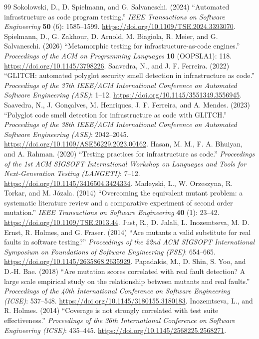 \begin{thebibliography}{99}
 Sokolowski, D., D. Spielmann, and G. Salvaneschi. (2024) ``Automated infrastructure as code program testing.'' \textit{IEEE Transactions on Software Engineering} \textbf{50} (6): 1585--1599. \url{https://doi.org/10.1109/TSE.2024.3393070}.
 Spielmann, D., G. Zakhour, D. Arnold, M. Biagiola, R. Meier, and G. Salvaneschi. (2026) ``Metamorphic testing for infrastructure-as-code engines.'' \textit{Proceedings of the ACM on Programming Languages} \textbf{10} (OOPSLA1): 118. \url{https://doi.org/10.1145/3798226}.
 Saavedra, N., and J. F. Ferreira. (2022) ``GLITCH: automated polyglot security smell detection in infrastructure as code.'' \textit{Proceedings of the 37th IEEE/ACM International Conference on Automated Software Engineering (ASE)}: 1--12. \url{https://doi.org/10.1145/3551349.3556945}.
 Saavedra, N., J. Gon\c{c}alves, M. Henriques, J. F. Ferreira, and A. Mendes. (2023) ``Polyglot code smell detection for infrastructure as code with GLITCH.'' \textit{Proceedings of the 38th IEEE/ACM International Conference on Automated Software Engineering (ASE)}: 2042--2045. \url{https://doi.org/10.1109/ASE56229.2023.00162}.
 Hasan, M. M., F. A. Bhuiyan, and A. Rahman. (2020) ``Testing practices for infrastructure as code.'' \textit{Proceedings of the 1st ACM SIGSOFT International Workshop on Languages and Tools for Next-Generation Testing (LANGETI)}: 7--12. \url{https://doi.org/10.1145/3416504.3424334}.
 Madeyski, L., W. Orzeszyna, R. Torkar, and M. J\'{o}zala. (2014) ``Overcoming the equivalent mutant problem: a systematic literature review and a comparative experiment of second order mutation.'' \textit{IEEE Transactions on Software Engineering} \textbf{40} (1): 23--42. \url{https://doi.org/10.1109/TSE.2013.44}.
 Just, R., D. Jalali, L. Inozemtseva, M. D. Ernst, R. Holmes, and G. Fraser. (2014) ``Are mutants a valid substitute for real faults in software testing?'' \textit{Proceedings of the 22nd ACM SIGSOFT International Symposium on Foundations of Software Engineering (FSE)}: 654--665. \url{https://doi.org/10.1145/2635868.2635929}.
 Papadakis, M., D. Shin, S. Yoo, and D.-H. Bae. (2018) ``Are mutation scores correlated with real fault detection? A large scale empirical study on the relationship between mutants and real faults.'' \textit{Proceedings of the 40th International Conference on Software Engineering (ICSE)}: 537--548. \url{https://doi.org/10.1145/3180155.3180183}.
 Inozemtseva, L., and R. Holmes. (2014) ``Coverage is not strongly correlated with test suite effectiveness.'' \textit{Proceedings of the 36th International Conference on Software Engineering (ICSE)}: 435--445. \url{https://doi.org/10.1145/2568225.2568271}.

\end{thebibliography}
